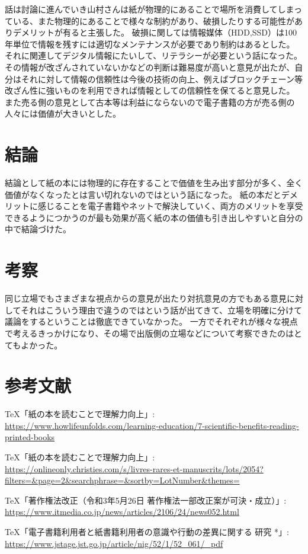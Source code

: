 \documentclass[12pt,a4j]{jarticle}
\begin{document}
話は討論に進んでいき山村さんは紙が物理的にあることで場所を消費してしまっている、また物理的にあることで様々な制約があり、破損したりする可能性がありデメリットが有ると主張した。
破損に関しては情報媒体（HDD,SSD）は100年単位で情報を残すには適切なメンテナンスが必要であり制約はあるとした。
それに関連してデジタル情報にたいして、リテラシーが必要という話になった。その情報が改ざんされていないかなどの判断は難易度が高いと意見が出たが、自分はそれに対して情報の信頼性は今後の技術の向上、例えばブロックチェーン等改ざん性に強いものを利用できれば情報としての信頼性を保てると意見した。
また売る側の意見として古本等は利益にならないので電子書籍の方が売る側の人々には価値が大きいとした。

\section{結論}
結論として紙の本には物理的に存在することで価値を生み出す部分が多く、全く価値がなくなったとは言い切れないのではという話になった。
紙の本だとデメリットに感じることを電子書籍やネットで解決していく、両方のメリットを享受できるようにつかうのが最も効果が高く紙の本の価値も引き出しやすいと自分の中で結論づけた。
\section{考察}
同じ立場でもさまざまな視点からの意見が出たり対抗意見の方でもある意見に対してそれはこういう理由で違うのではという話が出てきて、立場を明確に分けて議論をするということは徹底できていなかった。
一方でそれぞれが様々な視点で考えるきっかけになり、その場で出版側の立場などについて考察できたのはとてもよかった。

\section{参考文献}

\begin{thebibliography}{99}

     \TeX 「紙の本を読むことで理解力向上」: \url{https://www.howlifeunfolds.com/learning-education/7-scientific-benefits-reading-printed-books}

     \TeX 「紙の本を読むことで理解力向上」: \url{https://onlineonly.christies.com/s/livres-rares-et-manuscrits/lots/2054?filters=&page=2&searchphrase=&sortby=LotNumber&themes=}

     \TeX 「著作権法改正（令和3年5月26日 著作権法一部改正案が可決・成立）」: \url{https://www.itmedia.co.jp/news/articles/2106/24/news052.html}

     \TeX 「電子書籍利用者と紙書籍利用者の意識や行動の差異に関する
    研究 *」: \url{https://www.jstage.jst.go.jp/article/nig/52/1/52_061/_pdf}

\end{thebibliography}
\end{document}
